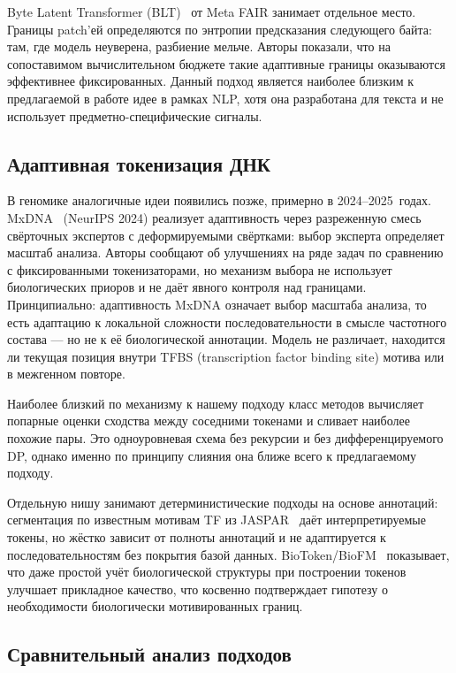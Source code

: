 Byte Latent Transformer (BLT)~\cite{bltByteLatentTransformer2024} от
Meta FAIR занимает отдельное место. Границы patch'ей определяются по энтропии
предсказания следующего байта: там, где модель неуверена, разбиение
мельче. Авторы показали, что на сопоставимом вычислительном бюджете
такие адаптивные границы оказываются эффективнее фиксированных. Данный
подход является наиболее близким к предлагаемой в работе идее в
рамках NLP, хотя
она разработана для текста и не использует предметно-специфические сигналы.

\subsection{Адаптивная токенизация ДНК}

В геномике аналогичные идеи появились позже, примерно в
2024--2025~годах. MxDNA~\cite{qiaoMxDNAAdaptiveDNA2024} (NeurIPS
2024) реализует адаптивность через разреженную смесь свёрточных
экспертов с деформируемыми свёртками: выбор эксперта определяет
масштаб анализа. Авторы сообщают об улучшениях на ряде задач по
сравнению с фиксированными токенизаторами, но механизм выбора не
использует биологических приоров и не даёт явного контроля над
границами. Принципиально: адаптивность MxDNA означает выбор масштаба
анализа, то есть адаптацию к локальной сложности последовательности в
смысле частотного состава --- но не к её биологической аннотации.
Модель не различает, находится ли текущая позиция внутри TFBS
(transcription factor binding site) мотива
или в межгенном повторе.

Наиболее близкий по механизму к нашему подходу класс методов
вычисляет попарные оценки сходства между соседними токенами и сливает
наиболее похожие пары. Это одноуровневая схема без рекурсии и без
дифференцируемого DP, однако именно по принципу слияния она ближе
всего к предлагаемому подходу.

Отдельную нишу занимают детерминистические подходы на основе
аннотаций: сегментация по известным мотивам TF из
JASPAR~\cite{rauluseviciuteJASPAR2024} даёт интерпретируемые токены,
но жёстко зависит от полноты аннотаций и не адаптируется к
последовательностям без покрытия базой данных.
BioToken/BioFM~\cite{bioTokenBioFM2025} показывает, что даже простой
учёт биологической структуры при построении токенов улучшает
прикладное качество, что косвенно подтверждает гипотезу о
необходимости биологически мотивированных границ.

\subsection{Сравнительный анализ подходов}

